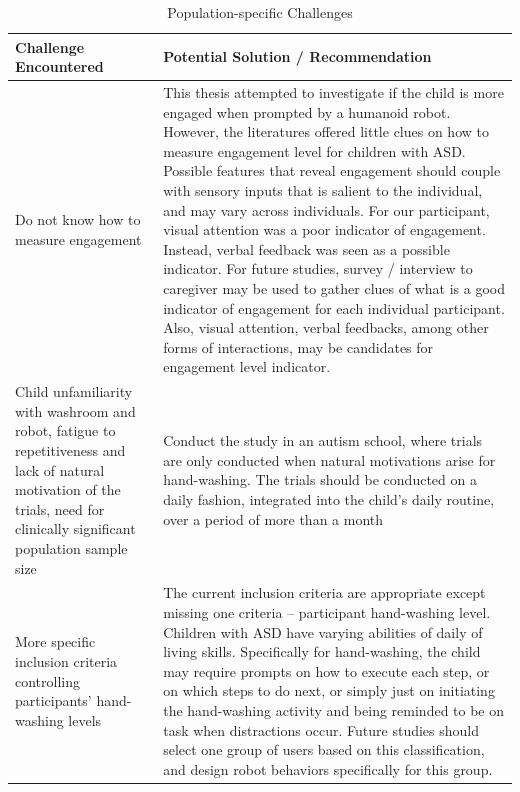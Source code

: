 \begin{table}[H]
	\centering
	\begin{tabular}{ | p{5cm} | p{10cm} | }
		\hline
		\textbf{Challenge Encountered}	&	\textbf{Potential Solution / Recommendation} \\	\hline
		Do not know how to measure engagement	&	This thesis attempted to investigate if the child is more engaged when prompted by a humanoid robot.  However, the literatures offered little clues on how to measure engagement level for children with ASD.  Possible features that reveal engagement should couple with sensory inputs that is salient to the individual, and may vary across individuals.  For our participant, visual attention was a poor indicator of engagement.  Instead, verbal feedback was seen as a possible indicator.  For future studies, survey / interview to caregiver may be used to gather clues of what is a good indicator of engagement for each individual participant.  Also, visual attention, verbal feedbacks, among other forms of interactions, may be candidates for engagement level indicator.	\\	\hline
		Child unfamiliarity with washroom and robot, fatigue to repetitiveness and lack of natural motivation of the trials, need for clinically significant population sample size	&	Conduct the study in an autism school, where trials are only conducted when natural motivations arise for hand-washing.  The trials should be conducted on a daily fashion, integrated into the child’s daily routine, over a period of more than a month	\\	\hline
		More specific inclusion criteria controlling participants’ hand-washing levels	&	The current inclusion criteria are appropriate except missing one criteria – participant hand-washing level.  Children with ASD have varying abilities of daily of living skills.  Specifically for hand-washing, the child may require prompts on how to execute each step, or on which steps to do next, or simply just on initiating the hand-washing activity and being reminded to be on task when distractions occur.  Future studies should select one group of users based on this classification, and design robot behaviors specifically for this group.	\\	\hline
	\end{tabular}
	\caption{Population-specific Challenges}
	\label{tab:PopulationChallenge}
\end{table}



